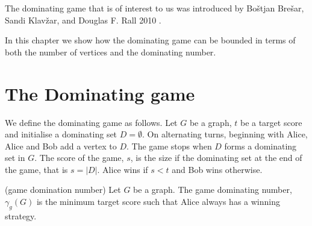 The dominating game that is of interest to us was introduced by Bo\v{s}tjan Bre\v{s}ar, Sandi Klav\v{z}ar, and Douglas F. Rall 2010 \cite{BrKlRa2010}. 

In this chapter we show how the dominating game can be bounded in terms of both the number of vertices and the dominating number.


\section{The Dominating game}

We define the dominating game as follows. Let $G$ be a graph, $t$ be a target score and initialise a dominating set $D=\emptyset$. On alternating turns, beginning with Alice, Alice and Bob add a vertex to $D$. The game stops when $D$ forms a dominating set in $G$. The score of the game, $s$, is the size if the dominating set at the end of the game, that is $s=|D|$. Alice wins if $s<t$ and Bob wins otherwise. %

\begin{definition}(game domination number)
    Let $G$ be a graph. The game dominating number, $\gamma_g(G)$ is the minimum target score such that Alice always has a winning strategy.
\end{definition} 

%        
%
%    
%
%
%
%
%    
    
